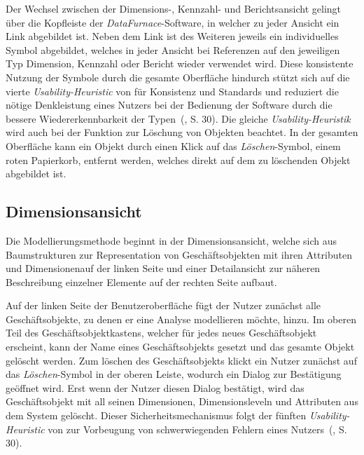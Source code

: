 \documentclass[
  language=german, %
  type=bachelor,%
  ngerman
]{isthesis}
\begin{document}
\begin{content}
  Der Wechsel zwischen der Dimensions-, Kennzahl- und Berichtsansicht gelingt
  über die Kopfleiste der \textit{DataFurnace}-Software, in welcher zu jeder
  Ansicht ein Link abgebildet ist. Neben dem Link ist des Weiteren jeweils ein
  individuelles Symbol abgebildet, welches in jeder Ansicht bei Referenzen auf
  den jeweiligen Typ Dimension, Kennzahl oder Bericht wieder verwendet wird.
  Diese konsistente Nutzung der Symbole durch die gesamte Oberfläche hindurch
  stützt sich auf die vierte \textit{Usability-Heuristic} von
  \textsc{\citeauthor{nielsen1994heuristic}} für Konsistenz und Standards und
  reduziert die nötige Denkleistung eines Nutzers bei der Bedienung der
  Software durch die bessere Wiedererkennbarkeit der
  Typen~(\citeyear{nielsen1994heuristic}, S. 30).  Die gleiche
  \textit{Usability-Heuristik} wird auch bei der Funktion zur Löschung von
  Objekten beachtet. In der gesamten Oberfläche kann ein Objekt durch einen
  Klick auf das \textit{Löschen}-Symbol, einem roten Papierkorb, entfernt
  werden, welches direkt auf dem zu löschenden Objekt abgebildet ist.


  \subsection{Dimensionsansicht}

  Die Modellierungsmethode beginnt in der Dimensionsansicht, welche sich aus
  Baumstrukturen zur Representation von Geschäftsobjekten mit ihren Attributen
  und Dimensionenauf der linken Seite und einer Detailansicht zur näheren
  Beschreibung einzelner Elemente auf der rechten Seite aufbaut. 

  Auf der linken Seite der Benutzeroberfläche fügt der Nutzer zunächst alle
  Geschäftsobjekte, zu denen er eine Analyse modellieren möchte, hinzu. Im
  oberen Teil des Geschäftsobjektkastens, welcher für jedes neues Geschäftsobjekt erscheint, kann
  der Name eines Geschäftsobjekts gesetzt und das gesamte Objekt gelöscht
  werden. Zum löschen des Geschäftsobjekts klickt ein Nutzer zunächst auf das
  \textit{Löschen}-Symbol in der oberen Leiste, wodurch ein Dialog zur
  Bestätigung geöffnet wird. Erst wenn der Nutzer diesen Dialog bestätigt, wird
  das Geschäftsobjekt mit all seinen Dimensionen, Dimensionsleveln und
  Attributen aus dem System gelöscht. Dieser Sicherheitsmechanismus folgt der
  fünften \textit{Usability-Heuristic} von
  \textsc{\citeauthor{nielsen1994heuristic}} zur Vorbeugung von schwerwiegenden
  Fehlern eines Nutzers~(\citeyear{nielsen1994heuristic}, S. 30).


\end{content}
\end{document}
